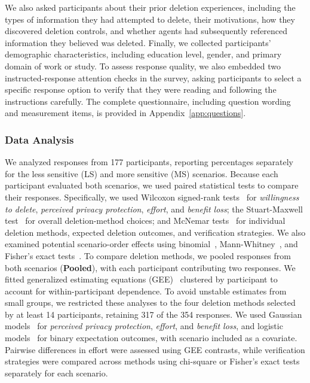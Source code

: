 %
We also asked participants about their prior deletion experiences, including the types of information they had attempted to delete, their motivations, how they discovered deletion controls, and whether agents had subsequently referenced information they believed was deleted.
%
Finally, we collected participants' demographic characteristics, including education level, gender, and primary domain of work or study. 
%
To assess response quality, we also embedded two instructed-response attention checks in the survey, asking participants to select a specific response option to verify that they were reading and following the instructions carefully.
%
The complete questionnaire, including question wording and measurement items, is provided in Appendix~\ref{app:questions}.


\subsubsection{Data Analysis}
%
We analyzed responses from 177 participants, reporting percentages separately for the less sensitive (LS) and more sensitive (MS) scenarios. 
%
Because each participant evaluated both scenarios, we used paired statistical tests to compare their responses. 
%
Specifically, we used Wilcoxon signed-rank tests~\cite{} for \textit{willingness to delete}, \textit{perceived privacy protection}, \textit{effort}, and \textit{benefit loss}; the Stuart-Maxwell test~\cite{} for overall deletion-method choices; and McNemar tests~\cite{} for individual deletion methods, expected deletion outcomes, and verification strategies. 
%
We also examined potential scenario-order effects using binomial~\cite{}, Mann-Whitney~\cite{}, and Fisher's exact tests~\cite{}. 
%
To compare deletion methods, we pooled responses from both scenarios (\textbf{Pooled}), with each participant contributing two responses. 
%
We fitted generalized estimating equations (GEE)~\cite{} clustered by participant to account for within-participant dependence. 
%
To avoid unstable estimates from small groups, we restricted these analyses to the four deletion methods selected by at least 14 participants, retaining 317 of the 354 responses. 
%
We used Gaussian models~\cite{} for \textit{perceived privacy protection}, \textit{effort}, and \textit{benefit loss}, and logistic models~\cite{} for binary expectation outcomes, with scenario included as a covariate. 
%
Pairwise differences in effort were assessed using GEE contrasts, while verification strategies were compared across methods using chi-square or Fisher's exact tests separately for each scenario.


